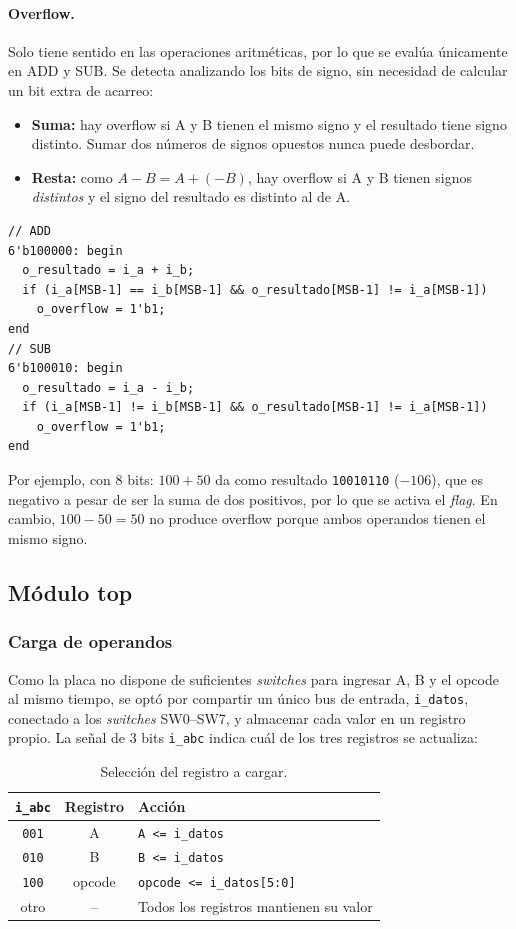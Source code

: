 \paragraph{Overflow.} Solo tiene sentido en las operaciones aritméticas, por lo que se evalúa únicamente en ADD y SUB. Se detecta analizando los bits de signo, sin necesidad de calcular un bit extra de acarreo:
\begin{itemize}
	\item \textbf{Suma:} hay overflow si A y B tienen el mismo signo y el resultado tiene signo distinto. Sumar dos números de signos opuestos nunca puede desbordar.
	\item \textbf{Resta:} como $A - B = A + (-B)$, hay overflow si A y B tienen signos \textit{distintos} y el signo del resultado es distinto al de A.
\end{itemize}

\begin{lstlisting}[caption={Detección de overflow en suma y resta.}]
// ADD
6'b100000: begin
  o_resultado = i_a + i_b;
  if (i_a[MSB-1] == i_b[MSB-1] && o_resultado[MSB-1] != i_a[MSB-1])
    o_overflow = 1'b1;
end
// SUB
6'b100010: begin
  o_resultado = i_a - i_b;
  if (i_a[MSB-1] != i_b[MSB-1] && o_resultado[MSB-1] != i_a[MSB-1])
    o_overflow = 1'b1;
end
\end{lstlisting}

Por ejemplo, con 8 bits: $100 + 50$ da como resultado \texttt{10010110} ($-106$), que es negativo a pesar de ser la suma de dos positivos, por lo que se activa el \textit{flag}. En cambio, $100 - 50 = 50$ no produce overflow porque ambos operandos tienen el mismo signo.

\subsection{Módulo top}

\subsubsection{Carga de operandos}
Como la placa no dispone de suficientes \textit{switches} para ingresar A, B y el opcode al mismo tiempo, se optó por compartir un único bus de entrada, \texttt{i\_datos}, conectado a los \textit{switches} SW0--SW7, y almacenar cada valor en un registro propio. La señal de 3 bits \texttt{i\_abc} indica cuál de los tres registros se actualiza:

\begin{table}[H]
	\centering
	\caption{Selección del registro a cargar.}
	\label{tab:abc}
	\begin{tabular}{ccl}
		\toprule
		\textbf{\texttt{i\_abc}} & \textbf{Registro} & \textbf{Acción} \\
		\midrule
		\texttt{001} & A & \texttt{A <= i\_datos} \\
		\texttt{010} & B & \texttt{B <= i\_datos} \\
		\texttt{100} & opcode & \texttt{opcode <= i\_datos[5:0]} \\
		otro & -- & Todos los registros mantienen su valor \\
		\bottomrule
	\end{tabular}
\end{table}

